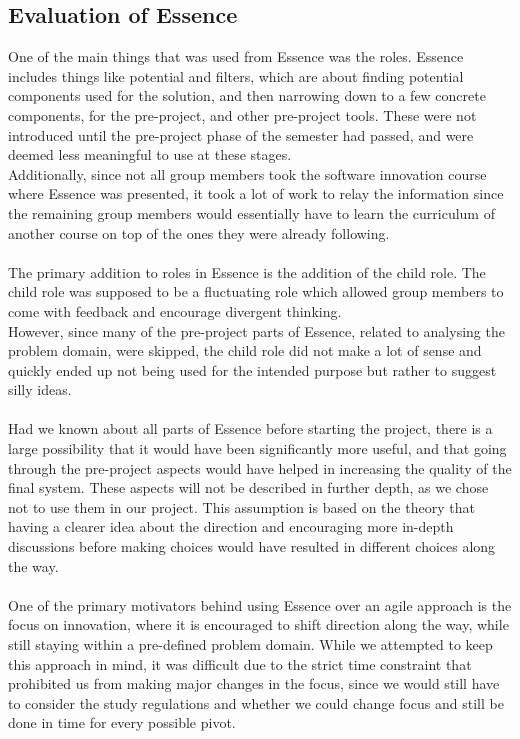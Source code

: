 \subsection{Evaluation of Essence}\label{evaluationessence}
One of the main things that was used from Essence was the roles.
Essence includes things like potential and filters, which are about finding potential components used for the solution, and then narrowing down to a few concrete components, for the pre-project, and other pre-project tools.
These were not introduced until the pre-project phase of the semester had passed, and were deemed less meaningful to use at these stages.\\
Additionally, since not all group members took the software innovation course where Essence was presented, it took a lot of work to relay the information since the remaining group members would essentially have to learn the curriculum of another course on top of the ones they were already following.
\\\\
The primary addition to roles in Essence is the addition of the child role.
The child role was supposed to be a fluctuating role which allowed group members to come with feedback and encourage divergent thinking.\\
However, since many of the pre-project parts of Essence, related to analysing the problem domain, were skipped, the child role did not make a lot of sense and quickly ended up not being used for the intended purpose but rather to suggest silly ideas.
\\\\
Had we known about all parts of Essence before starting the project, there is a large possibility that it would have been significantly more useful, and that going through the pre-project aspects would have helped in increasing the quality of the final system.
These aspects will not be described in further depth, as we chose not to use them in our project.
This assumption is based on the theory that having a clearer idea about the direction and encouraging more in-depth discussions before making choices would have resulted in different choices along the way.
\\\\
One of the primary motivators behind using Essence over an agile approach is the focus on innovation, where it is encouraged to shift direction along the way, while still staying within a pre-defined problem domain.
While we attempted to keep this approach in mind, it was difficult due to the strict time constraint that prohibited us from making major changes in the focus, since we would still have to consider the study regulations and whether we could change focus and still be done in time for every possible pivot.
